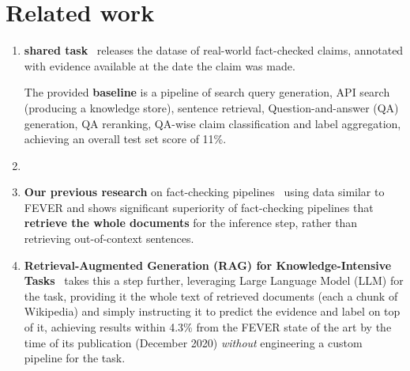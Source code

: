 \section{Related work}
\label{sec:relwork}
\label{avscore}
\begin{enumerate}
    \item \textbf{\averitec{} shared task}~\cite{averitec2024} releases the datase of real-world fact-checked claims, annotated with evidence available at the date the claim was made.
    

    The provided \textbf{baseline} is a pipeline of search query generation, API search (producing a knowledge store), sentence retrieval, Question-and-answer (QA) generation, QA reranking, QA-wise claim classification and label aggregation, achieving an overall \averitec{} test set score of 11\%.  
    \item {}
    \item \textbf{Our previous research} on fact-checking pipelines~\cite{Ullrich2023,drchal2023pipelinedatasetgenerationautomated} using data similar to FEVER and \averitec{} shows significant superiority of fact-checking pipelines that \textbf{retrieve the whole documents} for the inference step, rather than retrieving out-of-context sentences.
    \item \textbf{Retrieval-Augmented Generation (RAG) for Knowledge-Intensive Tasks}~\cite{rag} takes this a step further, leveraging Large Language Model (LLM) for the task, providing it the whole text of retrieved documents (each a chunk of Wikipedia) and simply instructing it to predict the evidence and label on top of it, achieving results within 4.3\% from the FEVER state of the art by the time of its publication (December 2020) \textit{without} engineering a custom pipeline for the task.
\end{enumerate}


